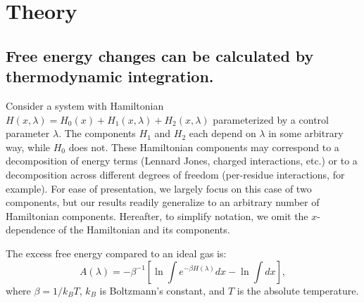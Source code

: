 \documentclass{article}
\begin{document}









\section{Theory}

\subsection{Free energy changes can be calculated by thermodynamic integration.}

Consider a system with Hamiltonian $H(x, \lambda) = H_0 (x) + H_1(x, \lambda) + H_2(x, \lambda)$ parameterized by a control parameter $\lambda$. The components $H_1$ and  $H_2$ each depend on $\lambda$ in some arbitrary way, while $H_0$ does not.  These Hamiltonian components may correspond to a decomposition of energy terms (Lennard Jones, charged interactions, etc.) or to a decomposition across different degrees of freedom (per-residue interactions, for example). For ease of presentation, we largely focus on this case of two components, but our results readily generalize to an arbitrary number of Hamiltonian components. Hereafter, to simplify notation, we omit the $x$-dependence of the Hamiltonian and its components.

The excess free energy compared to an ideal gas is:
\begin{equation}\label{eq:dA}
A(\lambda) = -\beta^{-1} \left[ 
	\ln \int e^{-\beta H(\lambda)} dx - 
	\ln \int dx
\right],
\end{equation}
where $\beta=1/k_BT$, $k_B$ is Boltzmann's constant, and $T$ is the absolute temperature.
\end{document}

